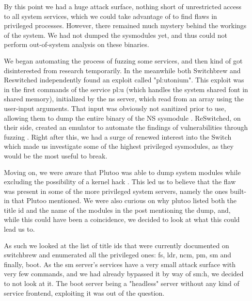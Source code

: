 \documentclass[journal]{IEEEtran}
\begin{document}
By this point we had a huge attack surface, nothing short of unrestricted
access to all system services, which we could take advantage of to find flaws in privileged
processes. However, there remained much mystery behind the workings of the system. We had not
dumped the sysmodules yet, and thus could not perform out-of-system analysis on these binaries.

We began automating the process of fuzzing some services, and then kind of got disinterested from
research temporarily. In the meanwhile both Switchbrew and Reswitched independently found an exploit
called "pl:utonium". This exploit was in the first commands of the service pl:u (which handles the
system shared font in shared memory), initialized by the ns server, which read from an array using
the user-input arguments. That input was obviously not sanitized prior to use, allowing them to
dump the entire binary of the NS sysmodule \cite{3ds_flaws}. ReSwitched, on their side, created an
emulator to automate the findings of vulnerabilities through fuzzing \cite{ctu}
\cite{mephisto}. Right after this, we had a surge of renewed interest into the
Switch which made us investigate some of the highest privileged sysmodules,
as they would be the most useful to break.

Moving on, we were aware that Plutoo was able to dump system modules \cite{modules_dump}
while excluding the possibility of a kernel hack \cite{kernel_modules}. This led
us to believe that the flaw was present in some of the more privileged system
servers, namely the ones built-in that Plutoo mentioned. We were also curious
on why plutoo listed both the title id and the name of the modules in the post\cite{modules_dump}
mentioning the dump, and, while this could have been a coincidence, we decided to look at what
this could lead us to.

As such we looked at the list of title ids that were currently documented on
switchbrew \cite{switch_title_list} and enumerated all the privileged ones: fs, ldr,
ncm, pm, sm and finally, boot. 
As the sm server's services have a very small attack surface with very few commands, and we had
already bypassed it by way of sm:h, we decided to not look at it. 
The boot server being a "headless" server without any kind of service frontend, exploiting it
was out of the question. 
\end{document}
